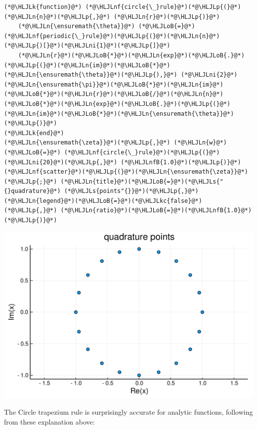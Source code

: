 \documentclass[12pt,a4paper]{article}
\newcommand{\HLJLk}[1]{\textcolor[RGB]{148,91,176}{\textbf{#1}}}
\newcommand{\HLJLkc}[1]{\textcolor[RGB]{59,151,46}{\textit{#1}}}
\newcommand{\HLJLn}[1]{#1}
\newcommand{\HLJLnf}[1]{\textcolor[RGB]{66,102,213}{#1}}
\newcommand{\HLJLs}[1]{\textcolor[RGB]{201,61,57}{#1}}
\newcommand{\HLJLnfB}[1]{\textcolor[RGB]{59,151,46}{#1}}
\newcommand{\HLJLni}[1]{\textcolor[RGB]{59,151,46}{#1}}
\newcommand{\HLJLoB}[1]{\textcolor[RGB]{102,102,102}{\textbf{#1}}}
\newcommand{\HLJLp}[1]{#1}
\begin{document}
\begin{lstlisting}
(*@\HLJLk{function}@*) (*@\HLJLnf{circle{\_}rule}@*)(*@\HLJLp{(}@*)(*@\HLJLn{n}@*)(*@\HLJLp{,}@*) (*@\HLJLn{r}@*)(*@\HLJLp{)}@*) 
    (*@\HLJLn{\ensuremath{\theta}}@*) (*@\HLJLoB{=}@*) (*@\HLJLnf{periodic{\_}rule}@*)(*@\HLJLp{(}@*)(*@\HLJLn{n}@*)(*@\HLJLp{)[}@*)(*@\HLJLni{1}@*)(*@\HLJLp{]}@*)
    (*@\HLJLn{r}@*)(*@\HLJLoB{*}@*)(*@\HLJLn{exp}@*)(*@\HLJLoB{.}@*)(*@\HLJLp{(}@*)(*@\HLJLn{im}@*)(*@\HLJLoB{*}@*)(*@\HLJLn{\ensuremath{\theta}}@*)(*@\HLJLp{),}@*) (*@\HLJLni{2}@*)(*@\HLJLn{\ensuremath{\pi}}@*)(*@\HLJLoB{*}@*)(*@\HLJLn{im}@*)(*@\HLJLoB{*}@*)(*@\HLJLn{r}@*)(*@\HLJLoB{/}@*)(*@\HLJLn{n}@*)(*@\HLJLoB{*}@*)(*@\HLJLn{exp}@*)(*@\HLJLoB{.}@*)(*@\HLJLp{(}@*)(*@\HLJLn{im}@*)(*@\HLJLoB{*}@*)(*@\HLJLn{\ensuremath{\theta}}@*)(*@\HLJLp{)}@*)
(*@\HLJLk{end}@*)
(*@\HLJLn{\ensuremath{\zeta}}@*)(*@\HLJLp{,}@*) (*@\HLJLn{w}@*) (*@\HLJLoB{=}@*) (*@\HLJLnf{circle{\_}rule}@*)(*@\HLJLp{(}@*)(*@\HLJLni{20}@*)(*@\HLJLp{,}@*) (*@\HLJLnfB{1.0}@*)(*@\HLJLp{)}@*)
(*@\HLJLnf{scatter}@*)(*@\HLJLp{(}@*)(*@\HLJLn{\ensuremath{\zeta}}@*)(*@\HLJLp{;}@*) (*@\HLJLn{title}@*)(*@\HLJLoB{=}@*)(*@\HLJLs{"{}quadrature}@*) (*@\HLJLs{points"{}}@*)(*@\HLJLp{,}@*) (*@\HLJLn{legend}@*)(*@\HLJLoB{=}@*)(*@\HLJLkc{false}@*)(*@\HLJLp{,}@*) (*@\HLJLn{ratio}@*)(*@\HLJLoB{=}@*)(*@\HLJLnfB{1.0}@*)(*@\HLJLp{)}@*)
\end{lstlisting}

\includegraphics[width=\linewidth]{figures/Lecture6_4_1.pdf}

The Circle trapezium rule is surprisingly accurate for analytic functions, following from these explanation above:
\end{document}
